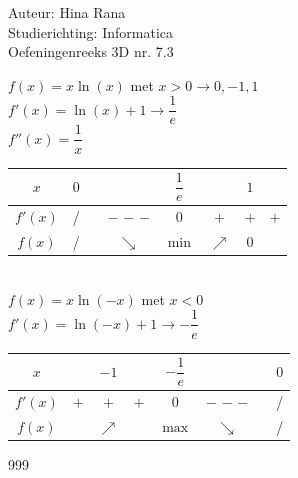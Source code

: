\documentclass[a4paper]{article}
\begin{document}
\noindent \large Auteur: Hina Rana \\
\noindent \large Studierichting: Informatica\\
\noindent \large Oefeningenreeks 3D nr. 7.3\\

\medskip

\normalsize

$f(x) = x \ln(x)$ met $x > 0 \to 0, -1, 1$ \\

$f'(x) = \ln(x) + 1 \to \dfrac{1}{e}$ \\

$f''(x) = \dfrac{1}{x}$ \\

\begin{tabular}{c|lcccccc}
$x$ & $0$ & & & $\dfrac{1}{e}$ & & $1$ & \\ \hline

$f'(x)$ & / & & $-$ $-$ $-$ & $0$ & $+$ & $+$ & $+$ \\

$f(x)$ & / & & $\searrow$ & $\min$ & $\nearrow$ & $0$ & 
\end{tabular} \\

$f(x) = x \ln(-x)$ met $x < 0$ \\

$f'(x) = \ln(-x) + 1 \to -\dfrac{1}{e}$ \\

\begin{tabular}{c|lcccccc}
$x$ & & $-1$ & & $-\dfrac{1}{e}$ & & & $0$ \\ \hline

$f'(x)$ & $+$ & $+$ & $+$ & $0$ & $-$ $-$ $-$ & & / \\

$f(x)$ & & $\nearrow$ & & $\max$ & $\searrow$ & & /
\end{tabular}


\begin{thebibliography}{999}
\end{thebibliography}
\end{document}
